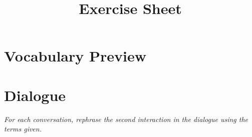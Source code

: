 \documentclass{article}
\title{Exercise Sheet}
\begin{document}
\section{Vocabulary Preview}

%
%
%
%
%
%
%
%
%
%
%
%
%
%
%
%
%
%
%
%


\newpage
\section{Dialogue}

\noindent \textit{For each conversation, rephrase the second interaction in the dialogue using the terms given.}

%
%
%
%
%
%
%
%
%
%
%
%
%
%
%
%
%
%
%
%



\newpage


%
%
%
%
%
%
%
%
%
%
%
%
%
%
%
%
%
%
%
%
\end{document}
